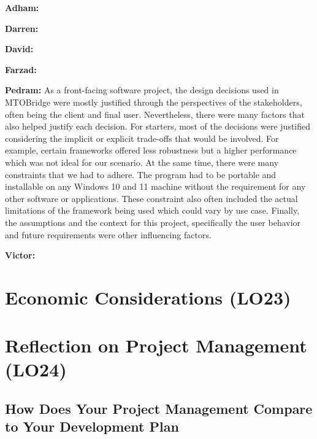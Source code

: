 \documentclass{article}
\begin{document}

\textbf{Adham:}

\textbf{Darren:}

\textbf{David:}

\textbf{Farzad:}

\textbf{Pedram:} As a front-facing software project, the design decisions used in MTOBridge were mostly justified through the perspectives of the stakeholders, often being the client and final user. Nevertheless, there were many factors that also helped justify each decision. For starters, most of the decisions were justified considering the implicit or explicit trade-offs that would be involved. For example, certain frameworks offered less robustness but a higher performance which was not ideal for our scenario. At the same time, there were many constraints that we had to adhere. The program had to be portable and installable on any Windows 10 and 11 machine without the requirement for any other software or applications. These constraint also often included the actual limitations of the framework being used which could vary by use case. Finally, the assumptions and the context for this project, specifically the user behavior and future requirements were other influencing factors. 

\textbf{Victor: }

\section{Economic Considerations (LO23)}


\section{Reflection on Project Management (LO24)}


\subsection{How Does Your Project Management Compare to Your Development Plan}
\end{document}
